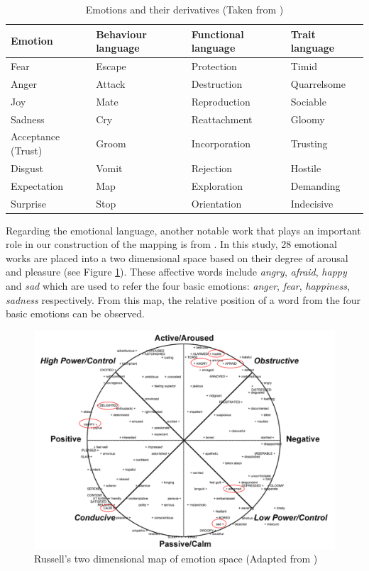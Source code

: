 \begin{table}
\caption{Emotions and their derivatives (Taken from \citet{plutchik2001integration})}
\label{table:derivationOfEmotion}
\centering
\begin{tabular}{|p{3cm}|p{3cm}|p{3cm}|p{3cm}|}
\hline
\textbf{Emotion} & \textbf{Behaviour language} & \textbf{Functional language} & \textbf{Trait language} \\
\hline
Fear & Escape & Protection & Timid \\
\hline
Anger & Attack & Destruction & Quarrelsome \\
\hline
Joy & Mate & Reproduction & Sociable \\
\hline
Sadness & Cry & Reattachment & Gloomy \\
\hline
Acceptance (Trust) & Groom & Incorporation & Trusting \\
\hline
Disgust & Vomit & Rejection & Hostile \\
\hline
Expectation & Map & Exploration & Demanding \\
\hline
Surprise & Stop & Orientation & Indecisive \\
\hline
\end{tabular}
\end{table}

Regarding the emotional language, another notable work that plays an important role in our construction of the mapping is from \citet{russell1980circumplex}. In this study, 28 emotional works are placed into a two dimensional space based on their degree of arousal and pleasure (see Figure \ref{fig:emotionSpace}). These affective words include \textit{angry}, \textit{afraid}, \textit{happy} and \textit{sad} which are used to refer the four basic emotions: \textit{anger}, \textit{fear}, \textit{happiness}, \textit{sadness} respectively. From this map, the relative position of a word from the four basic emotions can be observed.

\begin{figure}[htb!] 
\centering    
\includegraphics[width=1.0\textwidth]{EmotionSpace}
\caption{Russell's two dimensional map of emotion space (Adapted from \citet{scherer2005emotions})}
\label{fig:emotionSpace}
\end{figure}

